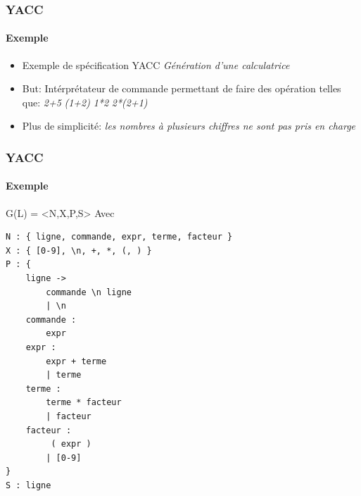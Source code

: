 \documentclass{beamer}
\begin{document}
\begin{frame}\frametitle{YACC}\framesubtitle{Exemple}

	\begin{itemize}
		\item Exemple de spécification YACC
				\subitem \textit{Génération d'une calculatrice}\newline
		\item But: Intérprétateur de commande permettant de faire des opération telles que:\newline
				\subitem \textit{2+5}\newline
				\subitem \textit{(1+2)}\newline
				\subitem \textit{1*2}\newline
				\subitem \textit{2*(2+1)}\newline
		\item Plus de simplicité:\newline
				\subitem \textit{les nombres à plusieurs chiffres ne sont pas pris en charge}
	\end{itemize}

\end{frame}

\begin{frame}[fragile,allowframebreaks=0.98]\frametitle{YACC}\framesubtitle{Exemple}

G(L) = <N,X,P,S> Avec
\begin{Verbatim}[fontsize=\scriptsize,frame=lines]
N : { ligne, commande, expr, terme, facteur }
X : { [0-9], \n, +, *, (, ) }
P : {
    ligne -> 		
        commande \n ligne
        | \n
    commande :	
        expr
    expr :		
        expr + terme
        | terme
    terme : 		
        terme * facteur
        | facteur
    facteur : 		
         ( expr )
        | [0-9]
}
S : ligne

\end{Verbatim}

\end{frame}
\end{document}
